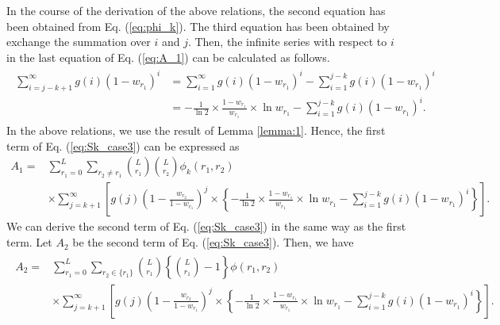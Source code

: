 In the course of the derivation of the above relations, the second equation has been obtained from Eq. (\ref{eq:phi_k}). The third equation has been obtained by exchange the summation over $i$ and $j$.
%
Then, the infinite series with respect to $i$ in the last equation of Eq. (\ref{eq:A_1}) can be calculated as follows.
\begin{align}\begin{split}
	\sum_{i=j-k+1}^{\infty} g(i)(1-w_{r_1})^{i} 
	&= \sum_{i=1}^{\infty} g(i)(1-w_{r_1})^{i} - \sum_{i=1}^{j-k} g(i)(1-w_{r_1})^{i} \\
	&= -\frac{1}{\ln 2} \times \frac{1-w_{r_1}}{w_{r_1}} \times \ln w_{r_1} - \sum_{i=1}^{j-k} g(i)(1-w_{r_1})^{i}.
\end{split}\end{align}
In the above relations, we use the result of Lemma \ref{lemma:1}.
Hence, the first term of Eq. (\ref{eq:Sk_case3}) can be expressed as
\begin{align}
	A_1 
	=& \sum_{r_1=0}^{L} \sum_{r_2 \neq r_1} \binom{L}{r_1}\binom{L}{r_2}\phi_k(r_1,r_2)\\
	&\times\sum_{j=k+1}^{\infty} \left[ g(j) \left(1-\frac{w_{r_2}}{1-w_{r_1}} \right)^{j} \times \left\{ -\frac{1}{\ln 2} \times \frac{1-w_{r_1}}{w_{r_1}} \times \ln w_{r_1} - \sum_{i=1}^{j-k} g(i)(1-w_{r_1})^{i} \right\} \right].
\end{align}
We can derive the second term of Eq. (\ref{eq:Sk_case3}) in the same way as the first term. Let $A_2$ be the second term of Eq. (\ref{eq:Sk_case3}). Then, we have
\begin{align}\begin{split}
	A_2 =& \sum_{r_1=0}^{L} \sum_{r_2 \in \{r_1\}} \binom{L}{r_1}\left\{\binom{L}{r_1}-1\right\} \phi(r_1,r_2) \\
	&\times\sum_{j=k+1}^{\infty} \left[ g(j) \left(1-\frac{w_{r_2}}{1-w_{r_1}} \right)^{j} \times \left\{ -\frac{1}{\ln 2} \times \frac{1-w_{r_1}}{w_{r_1}} \times \ln w_{r_1} - \sum_{i=1}^{j-k} g(i)(1-w_{r_1})^{i} \right\} \right].
\end{split}\end{align}

